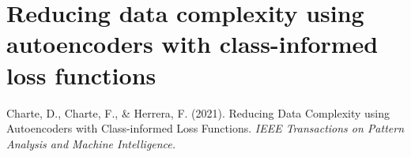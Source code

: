 \documentclass[
	fontsize=11pt, %
	twoside=false, %
	open=any, %
	secnumdepth=1, %
]{kaobook}
\begin{document}
%

\renewcommand*{\thechapter}{\Roman{chapter}}
\addtocounter{chapter}{5}
\chapter{Reducing data complexity using autoencoders with class-informed loss functions}

\begin{widepar}
  \begin{kaobox}[frametitle=Source]
    Charte, D., Charte, F., \& Herrera, F. (2021). Reducing Data Complexity using Autoencoders with Class-informed Loss Functions. \textit{IEEE Transactions on Pattern Analysis and Machine Intelligence.}
\end{kaobox}
\end{widepar}
%
%
%
%
\end{document}
